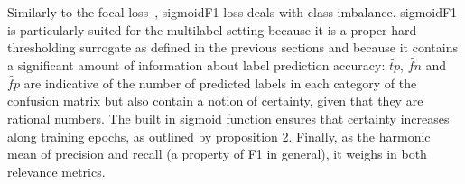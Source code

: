 Similarly to the focal loss~\cite{focalLoss}, sigmoidF1 loss deals with class imbalance. sigmoidF1 is particularly suited for the multilabel setting because it is a proper hard thresholding surrogate as defined in the previous sections and because it contains a significant amount of information about label prediction accuracy: $\widetilde{\mathit{tp}}$, $\widetilde{\mathit{fn}}$ and $\widetilde{\mathit{fp}}$ are indicative of the number of predicted labels in each category of the confusion matrix but also contain a notion of certainty, given that they are rational numbers. The built in sigmoid function ensures that certainty increases along training epochs, as outlined by proposition 2. Finally, as the harmonic mean of precision and recall (a property of F1 in general), it weighs in both relevance metrics.













